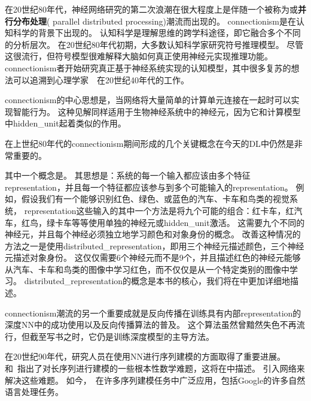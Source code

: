 在20世纪80年代，神经网络研究的第二次浪潮在很大程度上是伴随一个被称为或\textbf{并行分布处理}( parallel distributed processing)潮流而出现的\citep{Rumelhart86,mcclelland1995appeal}。
\gls{connectionism}是在认知科学的背景下出现的。
认知科学是理解思维的跨学科途径，即它融合多个不同的分析层次。
在20世纪80年代初期，大多数认知科学家研究符号推理模型。
尽管这很流行，但符号模型很难解释大脑如何真正使用神经元实现推理功能。 
\gls{connectionism}者开始研究真正基于神经系统实现的认知模型\citep{Touretzky1985}，其中很多复苏的想法可以追溯到心理学家~~在20世纪40年代的工作\citep{Hebb49}。

\gls{connectionism}的中心思想是，当网络将大量简单的计算单元连接在一起时可以实现智能行为。
这种见解同样适用于生物神经系统中的神经元，因为它和计算模型中\gls{hidden_unit}起着类似的作用。

在上世纪80年代的\gls{connectionism}期间形成的几个关键概念在今天的\gls{DL}中仍然是非常重要的。

其中一个概念是\citep{Hinton-et-al-PDP1986}。
其思想是：系统的每一个输入都应该由多个特征\gls{representation}，并且每一个特征都应该参与到多个可能输入的\gls{representation}。
例如，假设我们有一个能够识别红色、绿色、或蓝色的汽车、卡车和鸟类的视觉系统，
\gls{representation}这些输入的其中一个方法是将九个可能的组合：红卡车，红汽车，红鸟，绿卡车等等使用单独的神经元或\gls{hidden_unit}激活。
这需要九个不同的神经元，并且每个神经必须独立地学习颜色和对象身份的概念。
改善这种情况的方法之一是使用\gls{distributed_representation}，即用三个神经元描述颜色，三个神经元描述对象身份。 
这仅仅需要6个神经元而不是9个，并且描述红色的神经元能够从汽车、卡车和鸟类的图像中学习红色，而不仅仅是从一个特定类别的图像中学习。 
\gls{distributed_representation}的概念是本书的核心，我们将在中更加详细地描述。


\gls{connectionism}潮流的另一个重要成就是反向传播在训练具有内部\gls{representation}的深度\gls{NN}中的成功使用以及反向传播算法的普及\citep{RHW,Lecun-these87}。
这个算法虽然曾黯然失色不再流行，但截至写书之时，它仍是训练深度模型的主导方法。%

在20世纪90年代，研究人员在使用\gls{NN}进行序列建模的方面取得了重要进展。
\citet{Hochreiter91}和~\citet{Bengio1994ITNN}指出了对长序列进行建模的一些根本性数学难题，这将在中描述。
\citet{Hochreiter+Schmidhuber-1997}引入网络来解决这些难题。
如今，~在许多序列建模任务中广泛应用，包括Google的许多自然语言处理任务。

